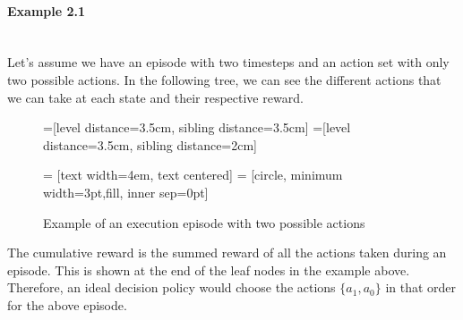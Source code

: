 \paragraph{Example 2.1}\mbox{}\\
Let's assume we have an episode with two timesteps and an action set with only two possible actions. In the following tree, we can see the different actions that we can take at each state and their respective reward.\\
\begin{figure}[h]
=[level distance=3.5cm, sibling distance=3.5cm]
=[level distance=3.5cm, sibling distance=2cm]

 = [text width=4em, text centered]
 = [circle, minimum width=3pt,fill, inner sep=0pt]

\begin{center}
	
\caption{Example of an execution episode with two possible actions}
\end{center}
\end{figure}

The cumulative reward is the summed reward of all the actions taken during an episode. This is shown at the end of the leaf nodes in the example above. Therefore, an ideal decision policy would choose the actions $\{a_1,a_0\}$ in that order for the above episode.
